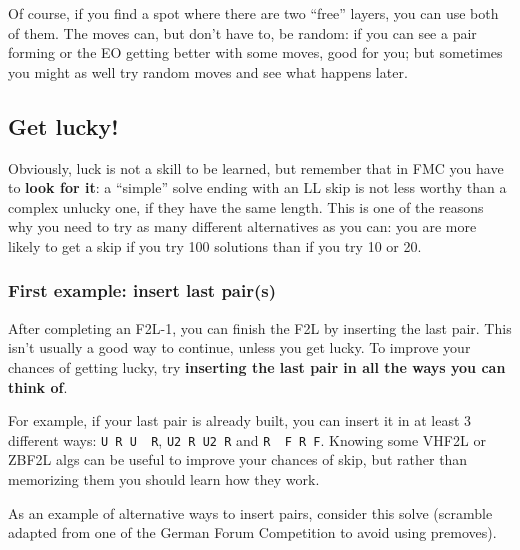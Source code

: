 \documentclass[11pt,a4paper]{book}
\newcommand{\p}{\textquotesingle}
\newcommand{\m}{\texttt}
\newcommand{\ps}{\p\,\,}
\begin{document}
Of course, if you find a spot where there are two ``free'' layers, you can use both of them. The moves can, but don't have to, be random: if you can see a pair forming or the EO getting better with some moves, good for you; but sometimes you might as well try random moves and see what happens later.

\subsection{Get lucky!}

Obviously, luck is not a skill to be learned, but remember that in FMC you have to \textbf{look for it}: a ``simple'' solve ending with an LL skip is not less worthy than a complex unlucky one, if they have the same length. This is one of the reasons why you need to try as many different alternatives as you can: you are more likely to get a skip if you try 100 solutions than if you try 10 or 20.

\subsubsection{First example: insert last pair(s)}
\label{insert_pairs}

After completing an F2L-1, you can finish the F2L by inserting the last pair. This isn't usually a good way to continue, unless you get lucky. To improve your chances of getting lucky, try \textbf{inserting the last pair in all the ways you can think of}.

For example, if your last pair is already built, you can insert it in at least 3 different ways: \m{U R U\ps R\p}, \m{U2 R U2 R\p} and \m{R\ps F R F\p}. Knowing some VHF2L or ZBF2L algs can be useful to improve your chances of skip, but rather than memorizing them you should learn how they work.

As an example of alternative ways to insert pairs, consider this solve (scramble adapted from one of the German Forum Competition to avoid using premoves).
\end{document}

